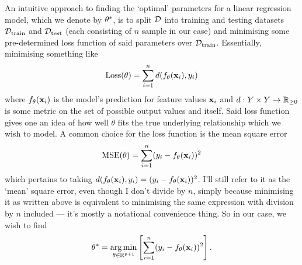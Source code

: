 \documentclass[11pt]{article}
\begin{document}
An intuitive approach to finding the `optimal' parameters for a linear regression model, which we denote by $\theta^{*}$, is to split $\mathcal{D}$ into training and testing datasets $\mathcal{D}_{\text{train}}$ and $\mathcal{D}_{\text{test}}$ (each consisting of $n$ sample in our case) and minimising some pre-determined loss function of said parameters over $\mathcal{D}_{\text{train}}$. Essentially, minimising something like
$$
\text{Loss}(\theta)=\sum_{i=1}^nd(f_{\theta}(\mathbf{x}_i), y_i)
$$
where $f_{\theta}(\mathbf{x}_i)$ is the model's prediction for feature values $\mathbf{x}_i$ and $d:Y\times Y\rightarrow\mathbb{R}_{\geq0}$ is some metric on the set of possible output values and itself. Said loss function gives one an idea of how well $\theta$ fits the true underlying relationship which we wish to model. A common choice for the loss function is the mean square error
$$
\text{MSE}(\theta)=\sum_{i=1}^n(y_i-f_{\theta}(\mathbf{x}_i))^2
$$
which pertains to taking $d(f_{\theta}(\mathbf{x}_i), y_i)=(y_i-f_{\theta}(\mathbf{x}_i))^2$. I'll still refer to it as the `mean' square error, even though I don't divide by $n$, simply because minimising it as written above is equivalent to minimising the same expression with division by $n$ included — it's mostly a notational convenience thing. So in our case, we wish to find
$$
\theta^{*}=\operatorname*{arg\,min}_{\theta\in\mathbb{R}^{p+1}}\left[\sum_{i=1}^n(y_i-f_{\theta}(\mathbf{x}_i))^2\right].
$$
\end{document}
